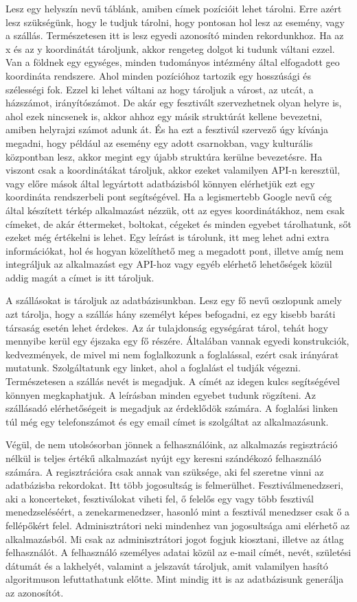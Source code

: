 Lesz egy helyszín nevű táblánk, amiben címek pozícióit lehet tárolni. Erre azért lesz szükségünk, hogy le tudjuk tárolni, hogy pontosan hol lesz az esemény, vagy a szállás. Természetesen itt is lesz egyedi azonosító minden rekordunkhoz. Ha az x és az y koordinátát tároljunk, akkor rengeteg dolgot ki tudunk váltani ezzel. Van a földnek egy egységes, minden tudományos intézmény által elfogadott geo koordináta rendszere. Ahol minden pozícióhoz tartozik egy hosszúsági és szélességi fok. Ezzel ki lehet váltani az hogy tároljuk a várost, az utcát, a házszámot, irányítószámot. De akár egy fesztivált szervezhetnek olyan helyre is, ahol ezek nincsenek is, akkor ahhoz egy másik struktúrát kellene bevezetni, amiben helyrajzi számot adunk át. És ha ezt a fesztivál szervező úgy kívánja megadni, hogy például az esemény egy adott csarnokban, vagy kulturális központban lesz, akkor megint egy újabb struktúra kerülne bevezetésre. Ha viszont csak a koordinátákat tároljuk, akkor ezeket valamilyen API-n keresztül, vagy előre mások által legyártott adatbázisból könnyen elérhetjük ezt egy koordináta rendszerbeli pont segítségével. Ha a legismertebb Google nevű cég által készített térkép alkalmazást nézzük, ott az egyes koordinátákhoz, nem csak címeket, de akár éttermeket, boltokat, cégeket és minden egyebet tárolhatunk, sőt ezeket még értékelni is lehet. Egy leírást is tárolunk, itt meg lehet adni extra információkat, hol és hogyan közelíthető meg a megadott pont, illetve amíg nem integráljuk az alkalmazást egy API-hoz vagy egyéb elérhető lehetőségek közül addig magát a címet is itt tároljuk.

A szállásokat is tároljuk az adatbázisunkban. Lesz egy fő nevű oszlopunk amely azt tárolja, hogy a szállás hány személyt képes befogadni, ez egy kisebb baráti társaság esetén lehet érdekes. Az ár tulajdonság egységárat tárol, tehát hogy mennyibe kerül egy éjszaka egy fő részére. Általában vannak egyedi konstrukciók, kedvezmények, de mivel mi nem foglalkozunk a foglalással, ezért csak irányárat mutatunk. Szolgáltatunk egy linket, ahol a foglalást el tudják végezni. Természetesen a szállás nevét is megadjuk. A címét az idegen kulcs segítségével könnyen megkaphatjuk. A leírásban minden egyebet tudunk rögzíteni. Az szállásadó elérhetőségeit is megadjuk az érdeklődök számára. A foglalási linken túl még egy telefonszámot és egy email címet is szolgáltat az alkalmazásunk.

Végül, de nem utolsósorban jönnek a felhasználóink, az alkalmazás regisztráció nélkül is teljes értékű alkalmazást nyújt egy keresni szándékozó felhasználó számára. A regisztrációra csak annak van szüksége, aki fel szeretne vinni az adatbázisba rekordokat. Itt több jogosultság is  felmerülhet. Fesztiválmenedzseri, aki a koncerteket, fesztiválokat viheti fel, ő felelős egy vagy több fesztivál menedzseléséért, a zenekarmenedzser, hasonló mint a fesztivál menedzser csak ő a fellépőkért felel. Adminisztrátori neki mindenhez van jogosultsága ami elérhető az alkalmazásból. Mi csak az adminisztrátori jogot fogjuk kiosztani, illetve az átlag felhasználót. A felhasználó személyes adatai közül az e-mail címét, nevét, születési dátumát és a lakhelyét, valamint a jelszavát tároljuk, amit valamilyen hasító algoritmuson lefuttathatunk előtte. Mint mindig itt is az adatbázisunk generálja az azonosítót.

